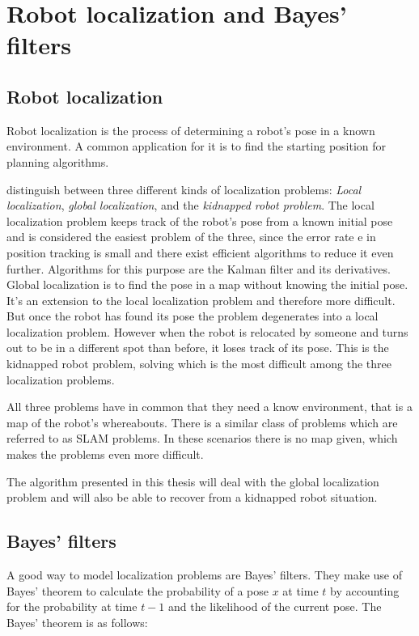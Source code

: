 \documentclass[Thesis.tex]{subfiles}
\begin{document}
\chapter{Robot localization and Bayes' filters}

\section{Robot localization}

Robot localization is the process of determining a robot's pose in a known environment. A common application for it is to find the starting position for planning algorithms. 

\citet{ThrunBurgardFox:2005} distinguish between three different kinds of localization problems: \emph{Local localization}, \emph{global localization}, and the \emph{kidnapped robot problem}. The local localization problem keeps track of the robot's pose from a known initial pose and is considered the easiest problem of the three, since the error rate e in position tracking is small and there exist efficient algorithms to reduce it even further. Algorithms for this purpose are the Kalman filter and its derivatives\cite[p.~40ff]{ThrunBurgardFox:2005}. Global localization is to find the pose in a map without knowing the initial pose. It's an extension to the local localization problem and therefore more difficult. But once the robot has found its pose the problem degenerates into a local localization problem. However when the robot is relocated by someone and turns out to be in a different spot than before, it loses track of its pose. This is the kidnapped robot problem, solving which is the most difficult among the three localization problems.

All three problems have in common that they need a know environment, that is a map of the robot's whereabouts. There is a similar class of problems which are referred to as \gls{SLAM} problems. In these scenarios there is no map given, which makes the problems even more difficult. 

The algorithm presented in this thesis will deal with the global localization problem and will also be able to recover from a kidnapped robot situation.

\section{Bayes' filters}
A good way to model localization problems are Bayes' filters. They make use of Bayes' theorem to calculate the probability of a pose $x$ at time $t$ by accounting for the probability at time $t-1$ and the likelihood of the current pose. The Bayes' theorem is as follows:
\end{document}
